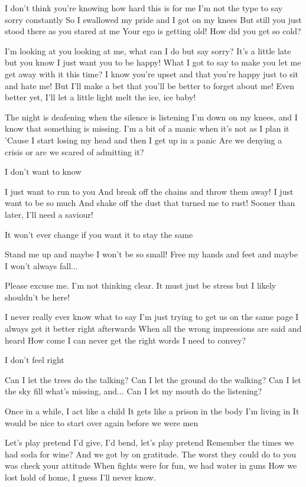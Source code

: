 I don't think you're knowing how hard this is for me
I'm not the type to say sorry constantly
So I swallowed my pride and I got on my knees
But still you just stood there as you stared at me
Your ego is getting old! How did you get so cold?

I'm looking at you looking at me, what can I do but say sorry?
It's a little late but you know I just want you to be happy!
What I got to say to make you let me get away with it this time?
I know you're upset and that you're happy just to sit and hate me!
But I'll make a bet that you'll be better to forget about me!
Even better yet, I'll let a little light melt the ice, ice baby!


The night is deafening when the silence is listening
I'm down on my knees, and I know that something is missing.
I'm a bit of a manic when it's not as I plan it
'Cause I start losing my head and then I get up in a panic
Are we denying a crisis or are we scared of admitting it?

I don't want to know

I just want to run to you
And break off the chains and throw them away!
I just want to be so much
And shake off the dust that turned me to rust!
Sooner than later, I'll need a saviour!

It won't ever change if you want it to stay the same

Stand me up and maybe I won't be so small!
Free my hands and feet and maybe I won't always fall...


Please excuse me. I'm not thinking clear.
It must just be stress but I likely shouldn't be here!

I never really ever know what to say
I'm just trying to get us on the same page
I always get it better right afterwards
When all the wrong impressions are said and heard
How come I can never get the right words I need to convey?

I don't feel right

Can I let the trees do the talking?
Can I let the ground do the walking?
Can I let the sky fill what's missing, and...
Can I let my mouth do the listening?


Once in a while, I act like a child
It gets like a prison in the body I'm living in
It would be nice to start over again before we were men

Let's play pretend
I'd give, I'd bend, let's play pretend
Remember the times we had soda for wine?
And we got by on gratitude.
The worst they could do to you was check your attitude
When fights were for fun, we had water in guns
How we lost hold of home, I guess I'll never know.

